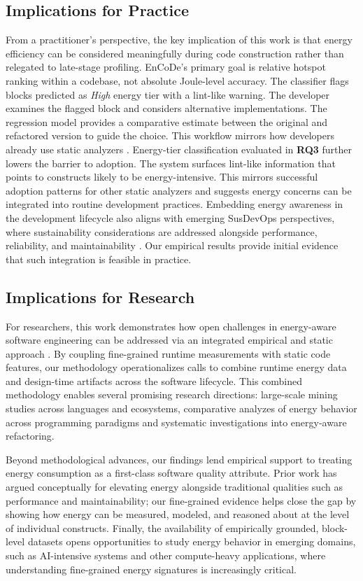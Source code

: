 \subsection{Implications for Practice}
From a practitioner's perspective, the key implication of this work is that energy efficiency can be considered meaningfully during code construction rather than relegated to late-stage profiling. EnCoDe's primary goal is relative hotspot ranking within a codebase, not absolute Joule-level accuracy. The classifier flags blocks predicted as \textit{High} energy tier with a lint-like warning. The developer examines the flagged block and considers alternative implementations. The regression model provides a comparative estimate between the original and refactored version to guide the choice. This workflow mirrors how developers already use static analyzers \cite{su14148596}.
Energy-tier classification  evaluated in \textbf{RQ3} further lowers the barrier to adoption. The system surfaces lint-like information that points to constructs likely to be energy-intensive. This mirrors successful adoption patterns for other static analyzers and suggests energy concerns can be integrated into routine development practices. Embedding energy awareness in the development lifecycle also aligns with emerging SusDevOps perspectives, where sustainability considerations are addressed alongside performance, reliability, and maintainability \cite{11023955,10.1145/3680470}. Our empirical results provide initial evidence that such integration is feasible in practice.

\subsection{Implications for Research}

For researchers, this work demonstrates how open challenges in energy-aware software engineering can be addressed via an integrated empirical and static approach \cite{LEE2024111944,ZARAGOZA2025115889,electronics14071331}. By coupling fine-grained runtime measurements with static code features, our methodology operationalizes calls to combine runtime energy data and design-time artifacts across the software lifecycle. This combined methodology enables several promising research directions: large-scale mining studies across languages and ecosystems, comparative analyzes of energy behavior across programming paradigms and systematic investigations into energy-aware refactoring.

Beyond methodological advances, our findings lend empirical support to treating energy consumption as a first-class software quality attribute. Prior work has argued conceptually for elevating energy alongside traditional qualities such as performance and maintainability; our fine-grained evidence helps close the gap by showing how energy can be measured, modeled, and reasoned about at the level of individual constructs. Finally, the availability of empirically grounded, block-level datasets opens opportunities to study energy behavior in emerging domains, such as AI-intensive systems and other compute-heavy applications, where understanding fine-grained energy signatures is increasingly critical.
